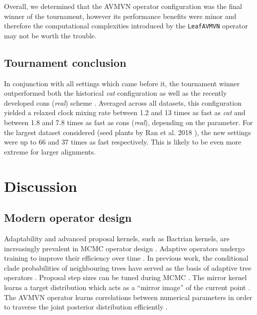 \documentclass[10pt,letterpaper]{article}
\begin{document}
Overall, we determined that the AVMVN operator configuration was the final winner of the tournament, however its performance benefits were minor and therefore the computational complexities introduced by the \texttt{LeafAVMVN} operator may not be worth the trouble.



\subsection*{Tournament conclusion}
 In conjunction with all settings which came before it, the tournament winner  outperformed both the historical \textit{cat} configuration \cite{drummond2006relaxed} as well as the recently developed cons (\textit{real}) scheme \cite{zhang2020improving}.
Averaged across all datasets, this configuration yielded a relaxed clock  mixing rate between 1.2 and 13 times as fast as \textit{cat} and between 1.8 and 7.8 times as fast as cons (\textit{real}), depending on the parameter.
For the largest dataset considered (seed plants by Ran et al. 2018 \cite{Ran_2018}), the new settings were up to 66 and 37 times as fast respectively.
This is likely to be even more extreme for larger alignments.



\section*{Discussion} \label{sect:discussion}







\subsection*{Modern operator design}


Adaptability and advanced proposal kernels, such as Bactrian kernels, are increasingly prevalent in MCMC operator design \cite{haario2001adaptive,vihola2012robust,benson2018adaptive,davis2020blocking}.
Adaptive operators undergo training to improve their efficiency over time \cite{roberts2007coupling}. 
In previous work, the conditional clade probabilities of neighbouring trees have served as the basis of adaptive tree operators \cite{hohna2012guided,meyer2019adaptive}.
Proposal step sizes can be tuned during MCMC \cite{rosenthal2011optimal}.
The mirror kernel learns a target distribution which acts as a ``mirror image'' of the current point \cite{thawornwattana2018designing}.
The AVMVN operator learns correlations between numerical parameters in order to traverse the joint posterior distribution efficiently \cite{baele2017adaptive}.
\end{document}
